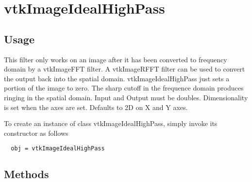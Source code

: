 \section{vtkImageIdealHighPass}

\subsection{Usage}

 This filter only works on an image after it has been converted to
 frequency domain by a vtkImageFFT filter.  A vtkImageRFFT filter
 can be used to convert the output back into the spatial domain.
 vtkImageIdealHighPass just sets a portion of the image to zero.  The sharp
 cutoff in the frequence domain produces ringing in the spatial domain.
 Input and Output must be doubles.  Dimensionality is set when the axes are
 set.  Defaults to 2D on X and Y axes.

To create an instance of class vtkImageIdealHighPass, simply
invoke its constructor as follows
\begin{verbatim}
  obj = vtkImageIdealHighPass
\end{verbatim}
\subsection{Methods}

